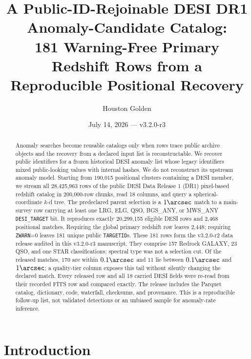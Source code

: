 \documentclass[twocolumn]{aastex701}
\newcommand{\paperVersion}{v3.2.0-r3}
\newcommand{\releaseVersion}{v3.2.0-r2}
\begin{document}
\title{A Public-ID-Rejoinable DESI DR1 Anomaly-Candidate Catalog:\\
181 Warning-Free Primary Redshift Rows from a Reproducible Positional Recovery}

\author{Houston Golden}
\date{July 14, 2026 --- \paperVersion}

\begin{abstract}
Anomaly searches become reusable catalogs only when rows trace public archive objects and the
recovery from a declared input list is reconstructable.  We recover public identifiers for a
frozen historical DESI anomaly list whose legacy identifiers mixed public-looking values with
internal hashes.  We do not reconstruct its upstream anomaly model.  Starting
from 190,015 positional clusters containing a DESI member, we stream all 28,425,963 rows of the
public DESI Data Release 1 (DR1) pixel-based redshift catalog in 200,000-row chunks, read 18
columns, and query a spherical-coordinate $k$-d tree.  The predeclared parent selection is a
$1\arcsec$ match to a main-survey row carrying at least one LRG, ELG, QSO, BGS\_ANY, or MWS\_ANY
\texttt{DESI\_TARGET} bit.  It reproduces exactly 20,299,155 eligible DESI rows and 2,468
positional matches.  Requiring the global primary redshift row leaves 2,448; requiring
\texttt{ZWARN}=0 leaves 181 unique public \texttt{TARGETID}s.  These 181 rows form the
\releaseVersion{} data release audited in this \paperVersion{} manuscript.  They comprise 157
Redrock GALAXY, 23 QSO, and one STAR classifications; spectral type
was not a selection cut.  Of the released matches, 170 are within
$0.1\arcsec$ and 11 lie between $0.1\arcsec$ and $1\arcsec$; a quality-tier column exposes this
tail without silently changing the declared match.  Every released row and all 18 carried DESI
fields were re-read from their recorded FITS row and compared exactly.  The release includes the
Parquet catalog, dictionary, code, waterfall, checksums, and provenance.  This is a reproducible
follow-up list, not validated detections or an unbiased sample for anomaly-rate inference.
\end{abstract}


\section{Introduction}\label{sec:introduction}
\end{document}
